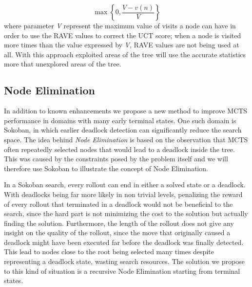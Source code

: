 \begin{equation}
    \max \left\{0,\frac{V - v(n)}{V}\right\}
\end{equation}
where parameter \textit{V} represent the maximum value of visits a node can have in order to use the RAVE values to correct the UCT score; when a node is visited more times than the value expressed by \textit{V}, RAVE values are not being used at all. With this approach exploited areas of the tree will use the accurate statistics more that unexplored areas of the tree.

\subsection{Node Elimination}
In addition to known enhancements we propose a new method to improve MCTS performance in domains with many early terminal states. One such domain is Sokoban, in which earlier deadlock detection can significantly reduce the search space. The idea behind \textit{Node Elimination} is based on the observation that MCTS often repeatedly selected nodes that would lead to a deadlock inside the tree. This was caused by the constraints posed by the problem itself and we will therefore use Sokoban to illustrate the concept of Node Elimination.

\medskip\noindent
In a Sokoban search, every rollout can end in either a solved state or a deadlock. With deadlocks being far more likely in non trivial levels, penalizing the reward of every rollout that terminated in a deadlock would not be beneficial to the search, since the hard part is not minimizing the cost to the solution but actually finding the solution. Furthermore, the length of the rollout does not give any insight on the quality of the rollout, since the move that originally caused a deadlock might have been executed far before the deadlock was finally detected. This lead to nodes close to the root being selected many times despite representing a deadlock state, wasting search resources. The solution we propose to this kind of situation is a recursive Node Elimination starting from terminal states.

